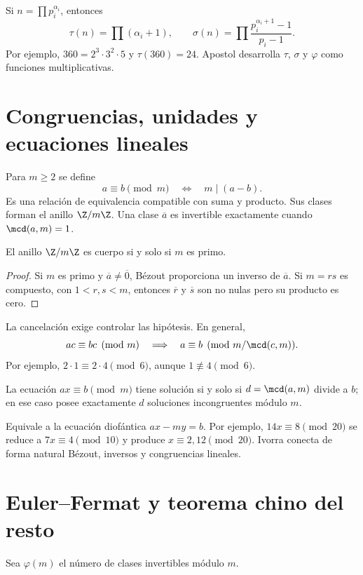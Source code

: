 \documentclass[10pt,a4paper]{article}
\begin{document}
\begin{ampliacion}
Si $n=\prod p_i^{\alpha_i}$, entonces
\[
\tau(n)=\prod(\alpha_i+1),\qquad
\sigma(n)=\prod\frac{p_i^{\alpha_i+1}-1}{p_i-1}.
\]
Por ejemplo, $360=2^3\cdot3^2\cdot5$ y $\tau(360)=24$. Apostol desarrolla $\tau$, $\sigma$ y $\varphi$ como funciones multiplicativas.
\end{ampliacion}

\section{Congruencias, unidades y ecuaciones lineales}
Para $m\ge2$ se define
\[
a\equiv b\pmod m\quad\Longleftrightarrow\quad m\mid(a-b).
\]
Es una relación de equivalencia compatible con suma y producto. Sus clases forman el anillo $\Z/m\Z$. Una clase $\overline a$ es invertible exactamente cuando $\mcd(a,m)=1$.

\begin{proposicion}
El anillo $\Z/m\Z$ es cuerpo si y solo si $m$ es primo.
\end{proposicion}
\begin{proof}
Si $m$ es primo y $\overline a\ne\overline0$, Bézout proporciona un inverso de $\overline a$. Si $m=rs$ es compuesto, con $1<r,s<m$, entonces $\overline r$ y $\overline s$ son no nulas pero su producto es cero.
\end{proof}

La cancelación exige controlar las hipótesis. En general,
\[
ac\equiv bc\pmod m\quad\Longrightarrow\quad a\equiv b\pmod{m/\mcd(c,m)}.
\]
Por ejemplo, $2\cdot1\equiv2\cdot4\pmod6$, aunque $1\not\equiv4\pmod6$.

\begin{teorema}
La ecuación $ax\equiv b\pmod m$ tiene solución si y solo si $d=\mcd(a,m)$ divide a $b$; en ese caso posee exactamente $d$ soluciones incongruentes módulo $m$.
\end{teorema}
Equivale a la ecuación diofántica $ax-my=b$. Por ejemplo, $14x\equiv8\pmod{20}$ se reduce a $7x\equiv4\pmod{10}$ y produce $x\equiv2,12\pmod{20}$. Ivorra conecta de forma natural Bézout, inversos y congruencias lineales.

\section{Euler--Fermat y teorema chino del resto}
Sea $\varphi(m)$ el número de clases invertibles módulo $m$.
\end{document}
